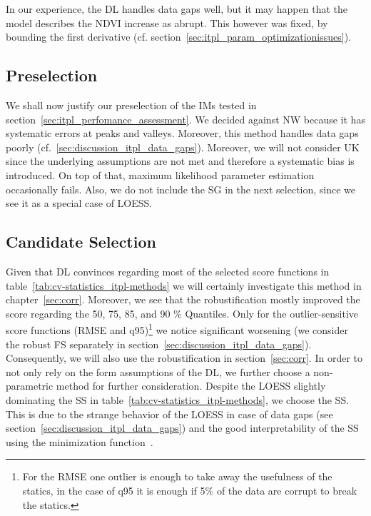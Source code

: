 {{        In our experience, the DL handles data gaps well, but it may happen that the model describes the NDVI increase as abrupt. This however was fixed, by bounding the first derivative (cf. section~\ref{sec:itpl_param_optimizationissues}).
    }

    \subsection{Preselection}{\label{sec:itpl_preselection}
        We shall now justify our preselection of the {{IM}}s tested in section~\ref{sec:itpl_perfomance_assessment}. 
        We decided against NW because it has systematic errors at peaks and valleys. Moreover, this method handles data gaps poorly (cf.~\ref{sec:discussion_itpl_data_gaps}). 
        Moreover, we will not consider UK since the underlying assumptions are not met and therefore a systematic bias is introduced. On top of that, maximum likelihood parameter estimation occasionally fails.
        Also, we do not include the SG in the next selection, since we see it as a special case of LOESS.
    }

    \subsection{Candidate Selection}{\label{sec:itpl_candiate_selection}
        Given that DL convinces regarding most of the selected score functions in table~\ref{tab:cv-statistics_itpl-methods} we will certainly investigate this method in chapter~\ref{sec:corr}. Moreover, we see that the robustification mostly improved the score regarding the 50, 75, 85, and 90 \% Quantiles. Only for the outlier-sensitive score functions (RMSE and q95)\footnote{For the RMSE one outlier is enough to take away the usefulness of the statics, in the case of q95 it is enough if 5\% of the data are corrupt to break the statics.} we notice significant worsening (we consider the robust FS separately in section~\ref{sec:discussion_itpl_data_gaps}). Consequently, we will also use the robustification in section~\ref{sec:corr}.
        In order to not only rely on the form assumptions of the DL, we further choose a non-parametric method for further consideration. Despite the LOESS slightly dominating the SS in table~\ref{tab:cv-statistics_itpl-methods}, we choose the SS. This is due to the strange behavior of the LOESS in case of data gaps (see section~\ref{sec:discussion_itpl_data_gaps}) and the good interpretability of the SS using the minimization function~.
    }
}


